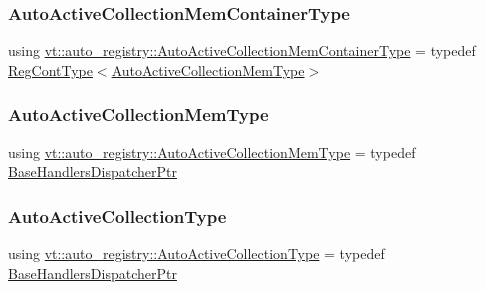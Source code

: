 \subsubsection{\texorpdfstring{Auto\+Active\+Collection\+Mem\+Container\+Type}{AutoActiveCollectionMemContainerType}}
{\footnotesize\ttfamily using \hyperlink{namespacevt_1_1auto__registry_a2843152c64eb58ed89991d1d2ae2c3f1}{vt\+::auto\+\_\+registry\+::\+Auto\+Active\+Collection\+Mem\+Container\+Type} = typedef \hyperlink{namespacevt_1_1auto__registry_a988a4943e4c8fe82b56f5b13bddceb2b}{Reg\+Cont\+Type}$<$\hyperlink{namespacevt_1_1auto__registry_af5d102e15ae09e22dbc560f5b64ec758}{Auto\+Active\+Collection\+Mem\+Type}$>$}

\mbox{\label{namespacevt_1_1auto__registry_af5d102e15ae09e22dbc560f5b64ec758}} 
\subsubsection{\texorpdfstring{Auto\+Active\+Collection\+Mem\+Type}{AutoActiveCollectionMemType}}
{\footnotesize\ttfamily using \hyperlink{namespacevt_1_1auto__registry_af5d102e15ae09e22dbc560f5b64ec758}{vt\+::auto\+\_\+registry\+::\+Auto\+Active\+Collection\+Mem\+Type} = typedef \hyperlink{namespacevt_1_1auto__registry_a0166496b1137bbc1b20adfeb5e19cf0e}{Base\+Handlers\+Dispatcher\+Ptr}}

\mbox{\label{namespacevt_1_1auto__registry_a14267fe1eee84b3f2205aecac48cafe4}} 
\subsubsection{\texorpdfstring{Auto\+Active\+Collection\+Type}{AutoActiveCollectionType}}
{\footnotesize\ttfamily using \hyperlink{namespacevt_1_1auto__registry_a14267fe1eee84b3f2205aecac48cafe4}{vt\+::auto\+\_\+registry\+::\+Auto\+Active\+Collection\+Type} = typedef \hyperlink{namespacevt_1_1auto__registry_a0166496b1137bbc1b20adfeb5e19cf0e}{Base\+Handlers\+Dispatcher\+Ptr}}

